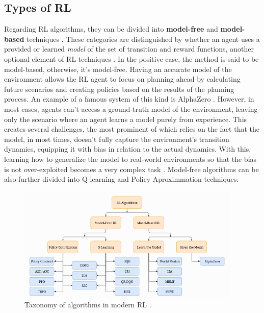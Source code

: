\subsection{Types of \ac{RL}}

Regarding \ac{RL} algorithms, they can be divided into \textbf{model-free} and \textbf{model-based} techniques \cite{openaiSpinningDocumentation}. These categories are distinguished by whether an agent uses a provided or learned \textit{model} of the set of transition and reward functions, another optional element of \ac{RL} techniques \cite{moralesGrokkingDeepReinforcement2020, openaiSpinningDocumentation}. In the positive case, the method is said to be model-based, otherwise, it's model-free. Having an accurate model of the environment allows the \ac{RL} agent to focus on planning ahead by calculating future scenarios and creating policies based on the results of the planning process. An example of a famous system of this kind is AlphaZero \cite{silverMasteringChessShogi2017}. However, in most cases, agents can't access a ground-truth model of the environment, leaving only the scenario where an agent learns a model purely from experience. This creates several challenges, the most prominent of which relies on the fact that the model, in most times, doesn't fully capture the environment's transition dynamics, equipping it with bias in relation to the actual dynamics. With this, learning how to generalize the model to real-world environments so that the bias is not over-exploited becomes a very complex task \cite{openaiSpinningDocumentation}.  Model-free algorithms can be also further divided into Q-learning and Policy Aproximmation techniques. \par


\begin{figure}[H]
	\centering
	\includegraphics[width=0.95\textwidth]{./figures/rl_algorithms.png}
	\caption{Taxonomy of algorithms in modern \ac{RL} \cite{openaiSpinningDocumentation}.}
	\label{fig:rl-algorithms}
\end{figure}

